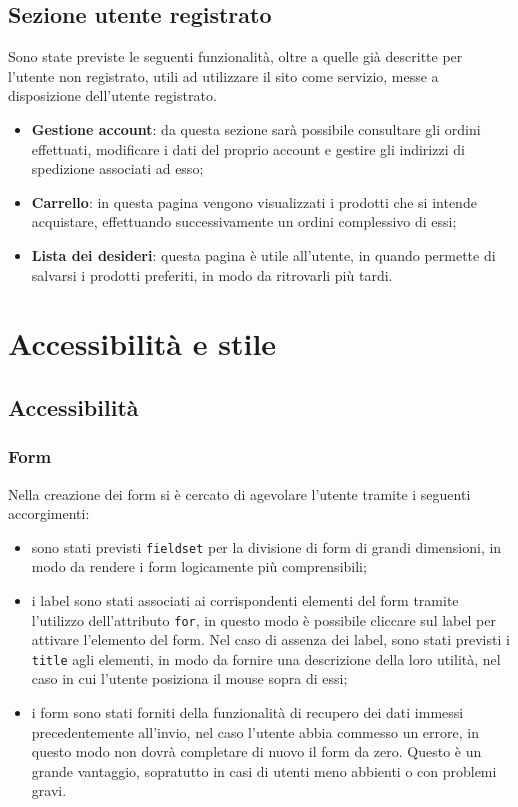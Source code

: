 	\subsection{Sezione utente registrato}
	Sono state previste le seguenti funzionalità, oltre a quelle già descritte per l'utente non registrato, utili ad utilizzare il sito come servizio, messe a disposizione dell'utente registrato.
	\begin{itemize}
		\item \textbf{Gestione account}: da questa sezione sarà possibile consultare gli ordini effettuati, modificare i dati del proprio account e gestire gli indirizzi di spedizione associati ad esso;
		\item \textbf{Carrello}: in questa pagina vengono visualizzati i prodotti che si intende acquistare, effettuando successivamente un ordini complessivo di essi;
		\item \textbf{Lista dei desideri}: questa pagina è utile all'utente, in quando permette di salvarsi i prodotti preferiti, in modo da ritrovarli più tardi.
	\end{itemize}

\section{Accessibilità e stile} %
	\subsection{Accessibilità}
	
		\subsubsection{Form}
		Nella creazione dei form si è cercato di agevolare l'utente tramite i seguenti accorgimenti:
		\begin{itemize}
			\item sono stati previsti \texttt{fieldset} per la divisione di form di grandi dimensioni, in modo da rendere i form logicamente più comprensibili;
			\item i label sono stati associati ai corrispondenti elementi del form tramite l'utilizzo dell'attributo \texttt{for}, in questo modo è possibile cliccare sul label per attivare l'elemento del form. Nel caso di assenza dei label, sono stati previsti i \texttt{title} agli elementi, in modo da fornire una descrizione della loro utilità, nel caso in cui l'utente posiziona il mouse sopra di essi;
			\item i form sono stati forniti della funzionalità di recupero dei dati immessi precedentemente all'invio, nel caso l'utente abbia commesso un errore, in questo modo non dovrà completare di nuovo il form da zero. Questo è un grande vantaggio, sopratutto in casi di utenti meno abbienti o con problemi gravi.
		\end{itemize}
	
